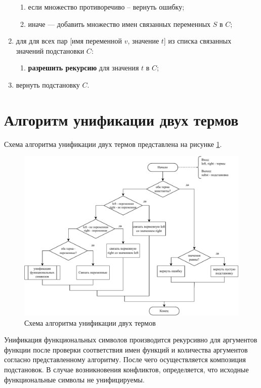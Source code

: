 \begin{enumerate}
\begin{enumerate}
        \item если множество противоречиво -- вернуть ошибку; 
        \item иначе --- добавить множество имен связанных переменных $S$ в $C$; 
    \end{enumerate}
    \item для для всех пар [имя переменной $v$, значение $t$] из списка связанных значений подстановки $C$:
    \begin{enumerate}
        \item \textbf{разрешить рекурсию} для значения $t$ в $C$;
    \end{enumerate}
    \item вернуть подстановку $C$.
\end{enumerate}


\clearpage

\section{Алгоритм унификации двух термов}

Схема алгоритма унификации двух термов представлена на рисунке \ref{fig:unify-term}.

\begin{figure}[h!]
    \includegraphics[width=\linewidth]{unify-term.pdf}
    \caption{Схема алгоритма унификации двух термов}
    \label{fig:unify-term}
\end{figure}

Унификация функциональных символов производится рекурсивно для аргументов функции после проверки соответствия имен функций и количества аргументов согласно представленному алгоритму. После чего осуществляется композиция подстановок. В случае возникновения конфликтов, определяется, что исходные функциональные символы не унифицируемы.

